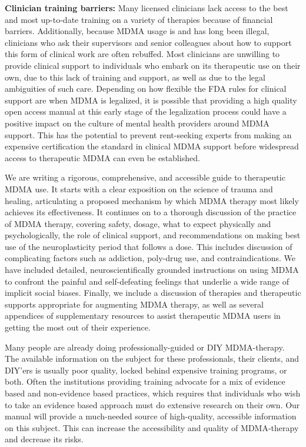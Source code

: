\documentclass[12pt,letterpaper]{article}
\begin{document}
\textbf{Clinician training barriers:} Many licensed clinicians lack access to the best and most up-to-date training on a variety of therapies because of financial barriers. Additionally, because MDMA usage is and has long been illegal, clinicians who ask their supervisors and senior colleagues about how to support this form of clinical work are often rebuffed. Most clinicians are unwilling to provide clinical support to individuals who embark on its therapeutic use on their own, due to this lack of training and support, as well as due to the legal ambiguities of such care. Depending on how flexible the FDA rules for clinical support are when MDMA is legalized, it is possible that providing a high quality open access manual at this early stage of the legalization process could have a positive impact on the culture of mental health providers around MDMA support. This has the potential to prevent rent-seeking experts from making an expensive certification the standard in clinical MDMA support before widespread access to therapeutic MDMA can even be established.

We are writing a rigorous, comprehensive, and accessible guide to therapeutic MDMA use. It starts with a clear exposition on the science of trauma and healing, articulating a proposed mechanism by which MDMA therapy most likely achieves its effectiveness. It continues on to a thorough discussion of the practice of MDMA therapy, covering safety, dosage, what to expect physically and psychologically, the role of clinical support, and recommendations on making best use of the neuroplasticity period that follows a dose. This includes discussion of complicating factors such as addiction, poly-drug use, and contraindications. We have included detailed, neuroscientifically grounded instructions on using MDMA to confront the painful and self-defeating feelings that underlie a wide range of implicit social biases. Finally, we include a discussion of therapies and therapeutic supports appropriate for augmenting MDMA therapy, as well as several appendices of supplementary resources to assist therapeutic MDMA users in getting the most out of their experience.

Many people are already doing professionally-guided or DIY MDMA-therapy. The available information on the subject for these professionals, their clients, and DIY'ers is usually poor quality, locked behind expensive training programs, or both. Often the institutions providing training advocate for a mix of evidence based and non-evidence based practices, which requires that individuals who wish to take an evidence based approach must do extensive research on their own. Our manual will provide a much-needed source of high-quality, accessible information on this subject. This can increase the accessibility and quality of MDMA-therapy and decrease its risks.
\end{document}
